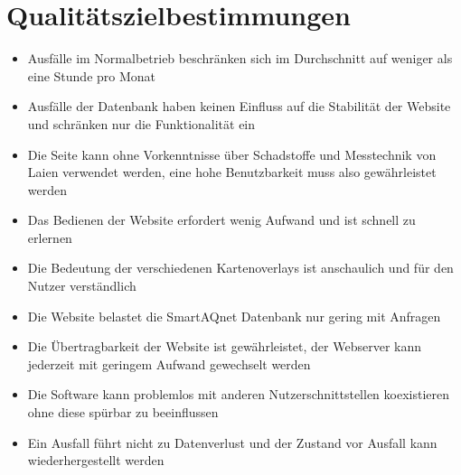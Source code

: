 \section{Qualitätszielbestimmungen}
\begin{itemize} [noitemsep]
    \item Ausfälle im Normalbetrieb beschränken sich im Durchschnitt auf weniger als eine Stunde pro Monat
    \item Ausfälle der Datenbank haben keinen Einfluss auf die Stabilität der Website und schränken nur die Funktionalität ein
    \item Die Seite kann ohne Vorkenntnisse über Schadstoffe und Messtechnik von Laien verwendet werden, eine hohe Benutzbarkeit muss also gewährleistet werden
    \item Das Bedienen der Website erfordert wenig Aufwand und ist schnell zu erlernen
    \item Die Bedeutung der verschiedenen \glspl{Kartenoverlay} ist anschaulich und für den Nutzer verständlich
    \item Die Website belastet die \gls{SmartAQnet} Datenbank nur gering mit Anfragen
    \item Die Übertragbarkeit der Website ist gewährleistet, der Webserver kann jederzeit mit geringem Aufwand gewechselt werden
    \item Die Software kann problemlos mit anderen Nutzerschnittstellen koexistieren ohne diese spürbar zu beeinflussen
    \item Ein Ausfall führt nicht zu Datenverlust und der Zustand vor Ausfall kann wiederhergestellt werden
\end{itemize}